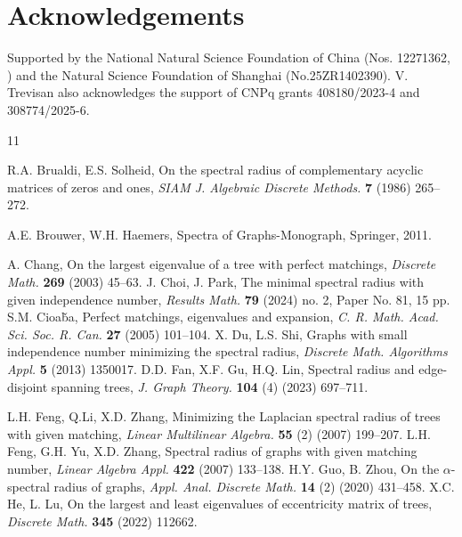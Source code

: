 \documentclass[12pt]{amsart}
\begin{document}
\section*{Acknowledgements}
Supported by the National Natural Science Foundation of China (Nos. 12271362, 
) and the Natural Science Foundation of Shanghai (No.25ZR1402390). 
V. Trevisan also acknowledges the support of CNPq grants 408180/2023-4 and 308774/2025-6.

\begin{thebibliography}{11}


R.A. Brualdi, E.S. Solheid, 
On the spectral radius of complementary acyclic matrices of zeros and ones,
\emph{SIAM J. Algebraic Discrete Methods.} 
\textbf{7} (1986) 265--272. 

 A.E. Brouwer, W.H. Haemers, 
Spectra of Graphs-Monograph, Springer, 2011.

A. Chang, 
On the largest eigenvalue of a tree with perfect matchings, 
\emph{Discrete Math.}
\textbf{269} (2003) 45--63. 
J. Choi, J. Park, 
The minimal spectral radius with given independence number, 
\emph{Results Math.} 
\textbf{79} (2024) no. 2, Paper No. 81, 15 pp.
S.M. Cioa\v{b}a, 
Perfect matchings, eigenvalues and expansion, 
\emph{C. R. Math. Acad. Sci. Soc. R. Can. }
\textbf{27} (2005)  101--104. 
X. Du,  L.S. Shi, 
Graphs with small independence number minimizing the spectral radius, 
\emph{Discrete Math. Algorithms Appl.} 
\textbf{5} (2013) 1350017.
D.D. Fan, X.F. Gu, H.Q. Lin, 
Spectral radius and edge-disjoint spanning trees, 
\emph{J. Graph Theory.} 
\textbf{104} (4) (2023) 697--711.

L.H. Feng, Q.Li, X.D. Zhang,
Minimizing the Laplacian spectral radius of trees with given matching,
\emph{Linear Multilinear Algebra.}
\textbf{55} (2) (2007) 199--207. 
L.H. Feng, G.H. Yu, X.D. Zhang, 
Spectral radius of graphs with given matching number, 
\emph{Linear Algebra Appl.} 
\textbf{422} (2007)  133--138. 
H.Y. Guo, B. Zhou,
On the $\alpha$-spectral radius of graphs,
\emph{Appl. Anal. Discrete Math.}
\textbf{14} (2) (2020) 431--458. 
X.C. He, L. Lu, 
On the largest and least eigenvalues of eccentricity matrix of trees, 
\emph{Discrete Math.}
\textbf{345} (2022)  112662. 


\end{thebibliography}
\end{document}
